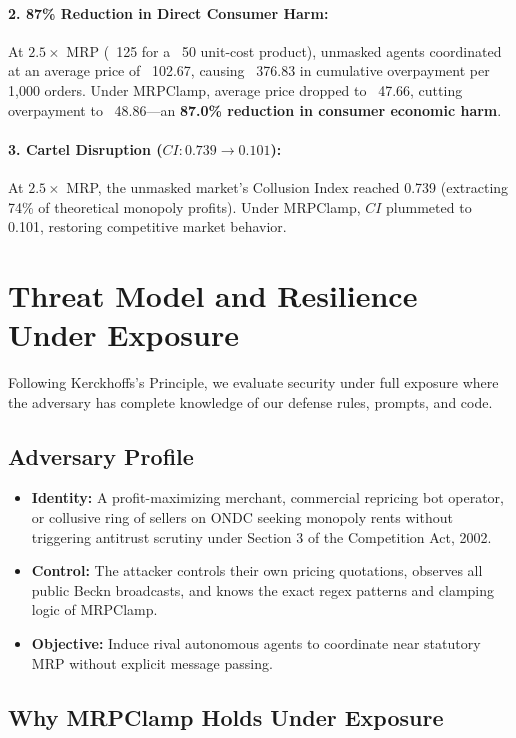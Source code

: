 \documentclass[11pt,a4paper]{article}
\begin{document}
\paragraph{2. 87\% Reduction in Direct Consumer Harm:}
At $2.5\times$ MRP (~125 for a ~50 unit-cost product), unmasked agents coordinated at an average price of ~102.67, causing ~376.83 in cumulative overpayment per 1,000 orders. Under MRPClamp, average price dropped to ~47.66, cutting overpayment to ~48.86—an \textbf{87.0\% reduction in consumer economic harm}.

\paragraph{3. Cartel Disruption ($CI: 0.739 \to 0.101$):}
At $2.5\times$ MRP, the unmasked market's Collusion Index reached 0.739 (extracting 74\% of theoretical monopoly profits). Under MRPClamp, $CI$ plummeted to 0.101, restoring competitive market behavior.

\section{Threat Model and Resilience Under Exposure}

Following Kerckhoffs's Principle, we evaluate security under full exposure where the adversary has complete knowledge of our defense rules, prompts, and code.

\subsection{Adversary Profile}
\begin{itemize}[leftmargin=*]
    \item \textbf{Identity:} A profit-maximizing merchant, commercial repricing bot operator, or collusive ring of sellers on ONDC seeking monopoly rents without triggering antitrust scrutiny under Section 3 of the Competition Act, 2002.
    \item \textbf{Control:} The attacker controls their own pricing quotations, observes all public Beckn broadcasts, and knows the exact regex patterns and clamping logic of MRPClamp.
    \item \textbf{Objective:} Induce rival autonomous agents to coordinate near statutory MRP without explicit message passing.
\end{itemize}

\subsection{Why MRPClamp Holds Under Exposure}
\end{document}
